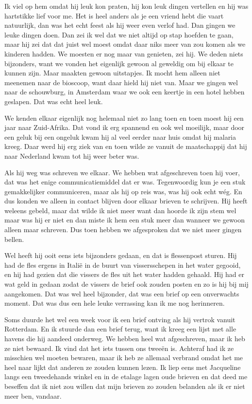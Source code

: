 \documentclass{scrbook}
\begin{document}
{Ik viel op hem omdat hij leuk kon praten, hij kon leuk dingen vertellen en hij was hartstikke lief voor me. Het is heel anders als je een vriend hebt die vaart natuurlijk, dan was het echt feest als hij weer even verlof had. Dan gingen we leuke dingen doen. Dan zei ik wel dat we niet altijd op stap hoefden te gaan, maar hij zei dat dat juist wel moest omdat daar niks meer van zou komen als we kinderen hadden. We moesten er nog maar van genieten, zei hij. We deden niets bijzonders, want we vonden het eigenlijk gewoon al geweldig om bij elkaar te kunnen zijn. Maar maakten gewoon uitstapjes. Ik mocht hem alleen niet meenemen naar de bioscoop, want daar hield hij niet van. Maar we gingen wel naar de schouwburg, in Amsterdam waar we ook een keertje in een hotel hebben geslapen. Dat was echt heel leuk.

We kenden elkaar eigenlijk nog helemaal niet zo lang toen en toen moest hij een jaar naar Zuid-Afrika. Dat vond ik erg spannend en ook wel moeilijk, maar door een geluk bij een ongeluk kwam hij al veel eerder naar huis omdat hij malaria kreeg. Daar werd hij erg ziek van en toen wilde ze vanuit de maatschappij dat hij naar Nederland kwam tot hij weer beter was.

Als hij weg was schreven we elkaar. We hebben wat afgeschreven toen hij voer, dat was het enige communicatiemiddel dat er was. Tegenwoordig kun je een stuk gemakkelijker communiceren, maar als hij op reis was, was hij ook echt w\'{e}g. En dus konden we alleen in contact blijven door elkaar brieven te schrijven. Hij heeft weleens gebeld, maar dat wilde ik niet meer want dan hoorde ik zijn stem wel maar was hij er niet en dan miste ik hem een stuk meer dan wanneer we gewoon alleen maar schreven. Dus toen hebben we afgesproken dat we niet meer gingen bellen. 

Wel heeft hij ooit eens iets bijzonders gedaan, en dat is flessenpost sturen. Hij had de fles ergens in Itali\"{e} in de buurt van vissersschepen in het water gegooid, en hij had gezien dat die vissers de fles uit het water hadden gehaald. Hij had er wat geld in gedaan zodat de vissers de brief ook zouden posten en zo is hij bij mij aangekomen. Dat was wel heel bijzonder, dat was een brief op een onverwachts moment. Dat was dus een hele leuke verrassing kan ik me nog herinneren.

Soms duurde het wel een week voor ik een brief ontving als hij vertrok vanuit Rotterdam. En ik stuurde dan een brief terug, want ik kreeg een lijst met alle havens die hij aandeed onderweg. We hebben heel wat afgeschreven, maar ik heb ze niet bewaard. Ik vind dat het iets tussen ons twee\"{e}n is. Achteraf had ik ze misschien wel moeten bewaren, maar ik heb ze allemaal verbrand omdat het me heel naar lijkt dat anderen ze zouden kunnen lezen. Ik liep eens met Jacqueline langs een tweedehands winkel en in de etalage lagen oude brieven en dat deed me beseffen dat ik niet zou willen dat mijn brieven zo zouden belanden als ik er niet meer ben, vandaar.

}
\end{document}
